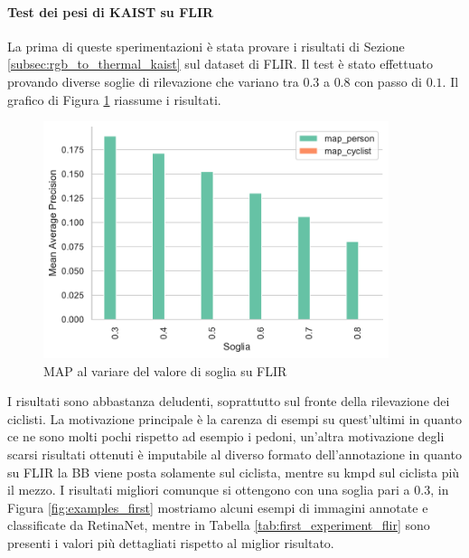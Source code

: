 \paragraph{Test dei pesi di KAIST su FLIR}
La prima di queste sperimentazioni è stata provare i risultati di Sezione \ref{subsec:rgb_to_thermal_kaist} sul dataset di FLIR. Il test è stato effettuato provando diverse soglie di rilevazione che variano tra $0.3$ a $0.8$ con passo di $0.1$. Il grafico di Figura \ref{fig:map_first_flir_lwir} riassume i risultati. 
\begin{figure}[]
    \centering
    \includegraphics[width = 0.9\textwidth]{images/graphic/first_test_lwir_map.pdf}
    \caption{MAP al variare del valore di soglia su FLIR}
    \label{fig:map_first_flir_lwir}
\end{figure}
I risultati sono abbastanza deludenti, soprattutto sul fronte della rilevazione dei ciclisti. La motivazione principale è la carenza di esempi su quest'ultimi in quanto ce ne sono molti pochi rispetto ad esempio i pedoni, un'altra motivazione degli scarsi risultati ottenuti è imputabile al diverso formato dell'annotazione in quanto su FLIR la \ac{BB} viene posta solamente sul ciclista, mentre su \ac{kmpd} sul ciclista più il mezzo. I risultati migliori comunque si ottengono con una soglia pari a $0.3$, in Figura \ref{fig:examples_first} mostriamo alcuni esempi di immagini annotate e classificate da RetinaNet, mentre in Tabella \ref{tab:first_experiment_flir} sono presenti i valori più dettagliati rispetto al miglior risultato. 
